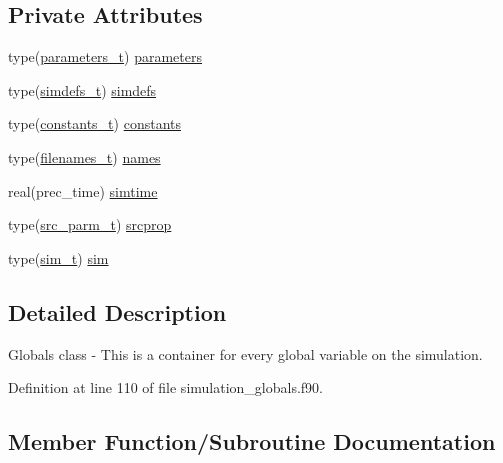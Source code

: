 \subsection*{Private Attributes}
\begin{DoxyCompactItemize}
\item 
type(\mbox{\hyperlink{structsimulation__globals__mod_1_1parameters__t}{parameters\+\_\+t}}) \mbox{\hyperlink{structsimulation__globals__mod_1_1globals__class_aef60024afa0a128d0af3d8a47a732657}{parameters}}
\item 
type(\mbox{\hyperlink{structsimulation__globals__mod_1_1simdefs__t}{simdefs\+\_\+t}}) \mbox{\hyperlink{structsimulation__globals__mod_1_1globals__class_aa066434c9dc6147331dce613422568ae}{simdefs}}
\item 
type(\mbox{\hyperlink{structsimulation__globals__mod_1_1constants__t}{constants\+\_\+t}}) \mbox{\hyperlink{structsimulation__globals__mod_1_1globals__class_af178aeb39fefa2c7dec6a74faa04819c}{constants}}
\item 
type(\mbox{\hyperlink{structsimulation__globals__mod_1_1filenames__t}{filenames\+\_\+t}}) \mbox{\hyperlink{structsimulation__globals__mod_1_1globals__class_a78946a154e6d498c1883c9280d4ca404}{names}}
\item 
real(prec\+\_\+time) \mbox{\hyperlink{structsimulation__globals__mod_1_1globals__class_ab28ea8e0cca87c11a33e4acfb3d3b293}{simtime}}
\item 
type(\mbox{\hyperlink{structsimulation__globals__mod_1_1src__parm__t}{src\+\_\+parm\+\_\+t}}) \mbox{\hyperlink{structsimulation__globals__mod_1_1globals__class_a39d1ca59bae468f4893a5391d20b6937}{srcprop}}
\item 
type(\mbox{\hyperlink{structsimulation__globals__mod_1_1sim__t}{sim\+\_\+t}}) \mbox{\hyperlink{structsimulation__globals__mod_1_1globals__class_a2bfeb5f54761daaffc19187307405940}{sim}}
\end{DoxyCompactItemize}


\subsection{Detailed Description}
Globals class -\/ This is a container for every global variable on the simulation. 

Definition at line 110 of file simulation\+\_\+globals.\+f90.



\subsection{Member Function/\+Subroutine Documentation}
\mbox{\label{structsimulation__globals__mod_1_1globals__class_a9438f8bdec469e7cbf9b898a398f9745}} 
